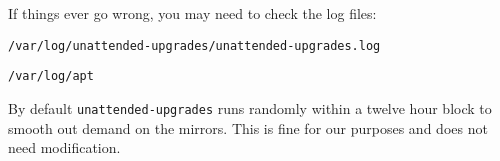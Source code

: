 %
%
%
%

If things ever go wrong, you may need to check the log files:

	\texttt{/var/log/unattended-upgrades/unattended-upgrades.log}
	
	\texttt{/var/log/apt}

By default \texttt{unattended-upgrades} runs randomly within a twelve hour block to smooth out demand on the mirrors. This is fine for our purposes and does not need modification.


%
%	
%
%
%
%

